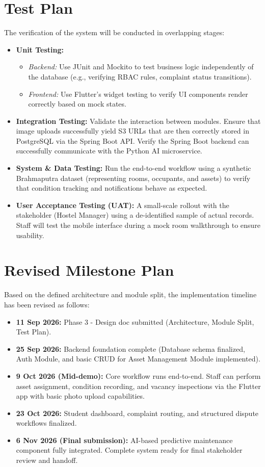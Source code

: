 \documentclass[11pt,a4paper]{article}
\begin{document}
\section{Test Plan}
The verification of the system will be conducted in overlapping stages:

\begin{itemize}
    \item \textbf{Unit Testing:} 
    \begin{itemize}[noitemsep]
        \item \textit{Backend:} Use JUnit and Mockito to test business logic independently of the database (e.g., verifying RBAC rules, complaint status transitions).
        \item \textit{Frontend:} Use Flutter's widget testing to verify UI components render correctly based on mock states.
    \end{itemize}
    \item \textbf{Integration Testing:} Validate the interaction between modules. Ensure that image uploads successfully yield S3 URLs that are then correctly stored in PostgreSQL via the Spring Boot API. Verify the Spring Boot backend can successfully communicate with the Python AI microservice.
    \item \textbf{System \& Data Testing:} Run the end-to-end workflow using a synthetic Brahmaputra dataset (representing rooms, occupants, and assets) to verify that condition tracking and notifications behave as expected.
    \item \textbf{User Acceptance Testing (UAT):} A small-scale rollout with the stakeholder (Hostel Manager) using a de-identified sample of actual records. Staff will test the mobile interface during a mock room walkthrough to ensure usability.
\end{itemize}

\section{Revised Milestone Plan}
Based on the defined architecture and module split, the implementation timeline has been revised as follows:

\begin{itemize}[noitemsep]
    \item \textbf{11 Sep 2026:} Phase 3 - Design doc submitted (Architecture, Module Split, Test Plan).
    \item \textbf{25 Sep 2026:} Backend foundation complete (Database schema finalized, Auth Module, and basic CRUD for Asset Management Module implemented).
    \item \textbf{9 Oct 2026 (Mid-demo):} Core workflow runs end-to-end. Staff can perform asset assignment, condition recording, and vacancy inspections via the Flutter app with basic photo upload capabilities.
    \item \textbf{23 Oct 2026:} Student dashboard, complaint routing, and structured dispute workflows finalized. 
    \item \textbf{6 Nov 2026 (Final submission):} AI-based predictive maintenance component fully integrated. Complete system ready for final stakeholder review and handoff.
\end{itemize}
\end{document}
